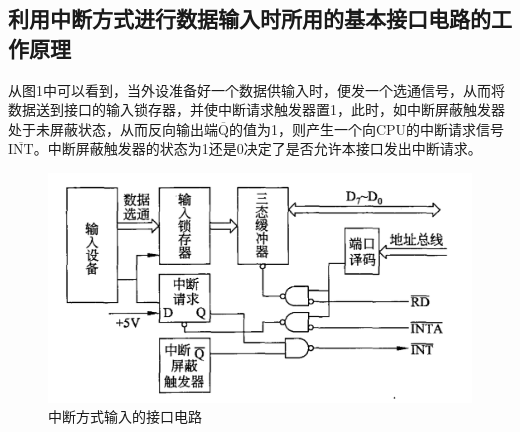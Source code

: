 \documentclass[UTF8]{ctexart}
\begin{document}
\subsection{利用中断方式进行数据输入时所用的基本接口电路的工作原理}
从图1中可以看到，当外设准备好一个数据供输入时，便发一个选通信号，从而将数据送到接口的输入锁存器，并使中断请求触发器置1，此时，如中断屏蔽触发器处于未屏蔽状态，从而反向输出端$\overline{\mathrm{Q}}$的值为1，则产生一个向CPU的中断请求信号$\overline{\mathrm{INT}}$。中断屏蔽触发器的状态为1还是0决定了是否允许本接口发出中断请求。
\begin{figure}[h]
	\centering
	\includegraphics[scale=0.5]{1.PNG}
	\caption{中断方式输入的接口电路}
\end{figure}
\end{document}
